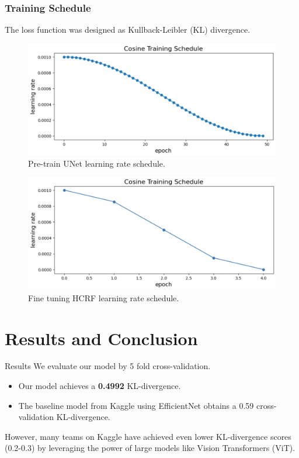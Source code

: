 \documentclass[leqno]{beamer}
\begin{document}
\begin{frame}
\frametitle{Training Schedule}
The loss function was designed as Kullback-Leibler (KL) divergence.
\begin{figure}[tbp]
\centering
\includegraphics[width=.55\textwidth]{pretrain}
\vspace{-.3em}
\caption{Pre-train UNet learning rate schedule.}
\end{figure}
\vspace{-1.2em}
\begin{figure}[tbp]
\centering
\includegraphics[width=.55\textwidth]{finetune}
\vspace{-.3em}
\caption{Fine tuning HCRF learning rate schedule.}
\end{figure}
\end{frame}



\section{Results and Conclusion}


\begin{frame}{Results}
We evaluate our model by 5 fold cross-validation.
\bigskip
\begin{itemize}
\item Our model achieves a \textbf{0.4992} KL-divergence.
\bigskip
\item The baseline model from Kaggle using EfficientNet obtains a 0.59
cross-validation KL-divergence.
\end{itemize}
\bigskip
However, many teams on Kaggle have achieved even lower
KL-divergence scores (0.2-0.3) by leveraging the power of large models
like Vision Transformers (ViT).
\end{frame}
\end{document}
